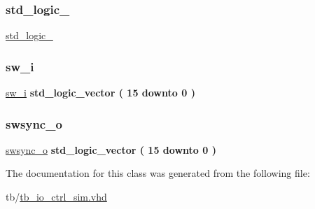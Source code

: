 \mbox{\label{classtb__io__ctrl_1_1sim_acd03516902501cd1c7296a98e22c6fcb}} 
\subsubsection{\texorpdfstring{std\+\_\+logic\+\_}{std\_logic\_1164}}
{\footnotesize\ttfamily \hyperlink{classtb__io__ctrl_1_1sim_acd03516902501cd1c7296a98e22c6fcb}{std\+\_\+logic\+\_}\hspace{0.3cm}{\ttfamily [Package]}}

\mbox{\label{classtb__io__ctrl_1_1sim_a0b9dc2012189ff08c5be99a0b802e7bb}} 
\subsubsection{\texorpdfstring{sw\+\_\+i}{sw\_i}}
{\footnotesize\ttfamily \hyperlink{classtb__io__ctrl_1_1sim_a0b9dc2012189ff08c5be99a0b802e7bb}{sw\+\_\+i} {\bfseries \textcolor{comment}{std\+\_\+logic\+\_\+vector}\textcolor{vhdlchar}{ }\textcolor{vhdlchar}{(}\textcolor{vhdlchar}{ }\textcolor{vhdlchar}{ } \textcolor{vhdldigit}{15} \textcolor{vhdlchar}{ }\textcolor{keywordflow}{downto}\textcolor{vhdlchar}{ }\textcolor{vhdlchar}{ } \textcolor{vhdldigit}{0} \textcolor{vhdlchar}{ }\textcolor{vhdlchar}{)}\textcolor{vhdlchar}{ }} \hspace{0.3cm}{\ttfamily [Signal]}}

\mbox{\label{classtb__io__ctrl_1_1sim_a520bda20a1a041dd2480ab8773097342}} 
\subsubsection{\texorpdfstring{swsync\+\_\+o}{swsync\_o}}
{\footnotesize\ttfamily \hyperlink{classtb__io__ctrl_1_1sim_a520bda20a1a041dd2480ab8773097342}{swsync\+\_\+o} {\bfseries \textcolor{comment}{std\+\_\+logic\+\_\+vector}\textcolor{vhdlchar}{ }\textcolor{vhdlchar}{(}\textcolor{vhdlchar}{ }\textcolor{vhdlchar}{ } \textcolor{vhdldigit}{15} \textcolor{vhdlchar}{ }\textcolor{keywordflow}{downto}\textcolor{vhdlchar}{ }\textcolor{vhdlchar}{ } \textcolor{vhdldigit}{0} \textcolor{vhdlchar}{ }\textcolor{vhdlchar}{)}\textcolor{vhdlchar}{ }} \hspace{0.3cm}{\ttfamily [Signal]}}



The documentation for this class was generated from the following file\+:\begin{DoxyCompactItemize}
\item 
tb/\hyperlink{tb__io__ctrl__sim_8vhd}{tb\+\_\+io\+\_\+ctrl\+\_\+sim.\+vhd}\end{DoxyCompactItemize}
